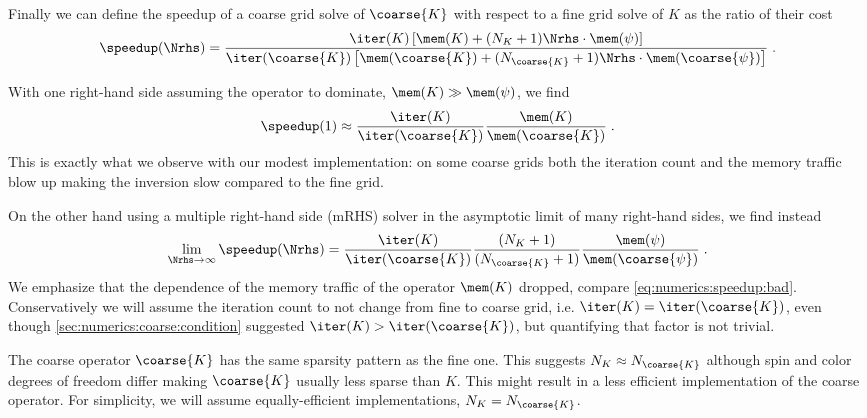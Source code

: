 Finally we can define the speedup of a coarse grid solve of $\coarse{K}$ with respect to a fine grid solve of $K$ as the ratio of their cost
\begin{equation}
\speedup(\Nrhs)
= \frac{
   \iter(K) \left[ \mem(K) + (N_{K} + 1) \Nrhs \cdot \mem(\psi) \right]
}{
   \iter(\coarse{K}) \left[ \mem(\coarse{K}) + (N_{\coarse{K}} + 1) \Nrhs \cdot \mem(\coarse{\psi}) \right]
} \;.
\end{equation}

With one right-hand side assuming the operator to dominate, $\mem(K) \gg \mem(\psi)$, we find
\begin{equation} \label{eq:numerics:speedup:bad}
\speedup(1)
\approx \frac{ \iter(K) }{ \iter(\coarse{K}) }
  \frac{ \mem(K) }{ \mem(\coarse{K}) } \;.
\end{equation}
This is exactly what we observe with our modest implementation: on some coarse grids both the iteration count and the memory traffic blow up making the inversion slow compared to the fine grid.

On the other hand using a multiple right-hand side (mRHS) solver in the asymptotic limit of many right-hand sides, we find instead
\begin{equation}
\lim_{\Nrhs \to \infty} \speedup(\Nrhs)
= \frac{ \iter(K) }{ \iter(\coarse{K}) }
\frac{ (N_{K} + 1) }{ (N_{\coarse{K}} + 1) }
  \frac{ \mem(\psi) }{ \mem(\coarse{\psi}) } \;.
\end{equation}
We emphasize that the dependence of the memory traffic of the operator $\mem(K)$ dropped, compare \cref{eq:numerics:speedup:bad}.
Conservatively we will assume the iteration count to not change from fine to coarse grid, i.e. $\iter(K) = \iter(\coarse{K})$, even though \cref{sec:numerics:coarse:condition} suggested $\iter(K) > \iter(\coarse{K})$, but quantifying that factor is not trivial.

The coarse operator $\coarse{K}$ has the same sparsity pattern as the fine one.
This suggests $N_{K} \approx N_{\coarse{K}}$ although spin and color degrees of freedom differ making $\coarse{K}$ usually less sparse than $K$.
This might result in a less efficient implementation of the coarse operator.
For simplicity, we will assume equally-efficient implementations, $N_{K} = N_{\coarse{K}}$.

